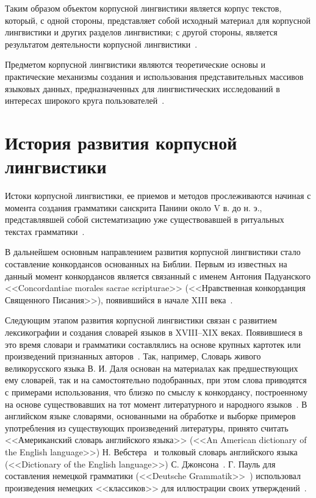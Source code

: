 Таким образом объектом корпусной лингвистики является корпус текстов, который, с одной стороны, представляет собой исходный материал для корпусной лингвистики и других разделов лингвистики; с другой стороны, является результатом деятельности корпусной лингвистики~\cite{Zaharov}.

Предметом корпусной лингвистики являются теоретические основы и практические механизмы создания и использования представительных массивов языковых данных, предназначенных для лингвистических исследований в интересах широкого круга пользователей~\cite{Zaharov}.

\section{История развития корпусной лингвистики}

Истоки корпусной лингвистики, ее приемов и методов прослеживаются начиная с момента создания грамматики санскрита Панини около V в. до н. э., представлявшей собой систематизацию уже существовавшей в ритуальных текстах грамматики~\cite{Voloshina,Kopotev}. 

В дальнейшем основным направлением развития корпусной лингвистики стало составление конкордансов основанных на Библии. Первым из известных на данный момент конкордансов является связанный с именем Антония Падуанского <<Concordantiae morales sacrae scripturae>> (<<Нравственная конкорданция Священного Писания>>), появившийся в начале XIII века~\cite{handbook,Kopotev}.

Следующим этапом развития корпусной лингвистики связан с развитием лексикографии и создания словарей языков в XVIII--XIX веках. Появившиеся в это время словари и грамматики составлялись на основе крупных картотек или произведений признанных авторов~\cite{Kopotev}. Так, например, Словарь живого великорусского языка В. И. Даля основан на материалах как предшествующих ему словарей, так и на самостоятельно подобранных, при этом слова приводятся с примерами использования, что близко по смыслу к конкордансу, построенному на основе существовавших на тот момент литературного и народного языков~\cite{Dal,Kopotev}. В английском языке словарями, основанными на обработке и выборке примеров употребления из существующих произведений литературы, принято считать <<Американский словарь английского языка>> (<<An American dictionary of the English language>>) Н. Вебстера~\cite{Webster} и толковый словарь английского языка (<<Dictionary of the English language>>) С. Джонсона~\cite{Johnson}. Г. Пауль для составления немецкой грамматики (<<Deutsche Grammatik>>~\cite{Paul}) использовал произведения немецких <<классиков>> для иллюстрации своих утверждений~\cite{Zaharov}.


